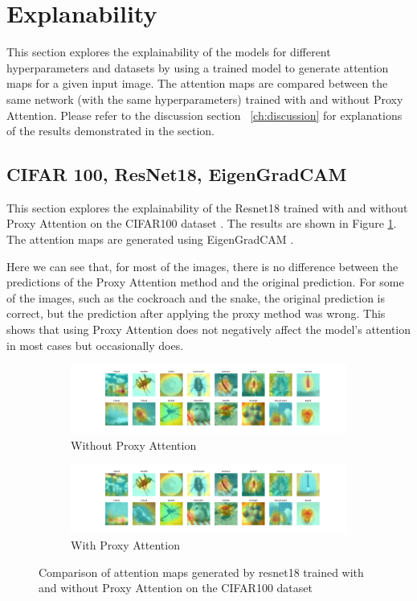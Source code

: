 \documentclass[a4paper,11pt,openright]{book}
\begin{document}
\section{Explanability}
This section explores the explainability of the models for different hyperparameters and datasets by using a trained model to generate attention maps for a given input image. The attention maps are compared between the same network (with the same hyperparameters) trained with and without Proxy Attention. Please refer to the discussion section ~\ref{ch:discussion} for explanations of the results demonstrated in the section.

\subsection{CIFAR 100, ResNet18, EigenGradCAM}
This section explores the explainability of the Resnet18 \cite{heDeepResidualLearning2016} trained with and without Proxy Attention on the CIFAR100 dataset \cite{krizhevskyLearningMultipleLayers}. The results are shown in Figure \ref{fig:resnet18_cifar100}. The attention maps are generated using EigenGradCAM \cite{banymuhammadEigenCAMVisualExplanations2021}.

Here we can see that, for most of the images, there is no difference between the predictions of the Proxy Attention method and the original prediction. For some of the images, such as the cockroach and the snake, the original prediction is correct, but the prediction after applying the proxy method was wrong. This shows that using Proxy Attention does not negatively affect the model's attention in most cases but occasionally does. 

\begin{figure}[!htb]
    \begin{subfigure}[b]{1\textwidth}
        \includegraphics[width=\linewidth]{images/cifar100_resnet18_noproxy_1.pdf}
        \caption{Without Proxy Attention}
    \end{subfigure}
    \begin{subfigure}[b]{1\textwidth}
        \includegraphics[width=\linewidth]{images/cifar100_resnet18_proxy_1.pdf}
        \caption{With Proxy Attention}
    \end{subfigure}
    
    \caption{Comparison of attention maps generated by resnet18 trained with and without Proxy Attention on the CIFAR100 dataset}
    \label{fig:resnet18_cifar100}
\end{figure}
\end{document}
